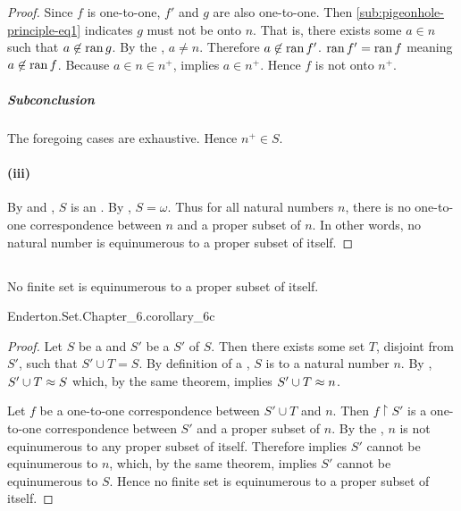 \documentclass{report}
\begin{document}
\begin{proof}
        Since $f$ is one-to-one, $f'$ and $g$ are also one-to-one.
        Then \eqref{sub:pigeonhole-principle-eq1} indicates $g$ must not be onto
          $n$.
        That is, there exists some $a \in n$ such that $a \not\in \mathop{\text{ran}}{g}$.
        By the , $a \neq n$.
        Therefore $a \not\in \mathop{\text{ran}}{f'}$.
        $\mathop{\text{ran}}{f'} = \mathop{\text{ran}}{f}$ meaning $a \not\in \mathop{\text{ran}}{f}$.
        Because $a \in n \in n^+$,  implies $a \in n^+$.
        Hence $f$ is not onto $n^+$.

      \subparagraph{Subconclusion}%

        The foregoing cases are exhaustive.
        Hence $n^+ \in S$.

    \paragraph{(iii)}%

      By  and
        , $S$ is an
        .
      By , $S = \omega$.
      Thus for all natural numbers $n$, there is no one-to-one correspondence
        between $n$ and a proper subset of $n$.
      In other words, no natural number is equinumerous to a proper subset of
        itself.

  \end{proof}

\subsection{}%

  \begin{corollary}[6C]
    No finite set is equinumerous to a proper subset of itself.
  \end{corollary}

    {Enderton.Set.Chapter\_6.corollary\_6c}

  \begin{proof}
    Let $S$ be a  and $S'$ be a
       $S'$ of $S$.
    Then there exists some set $T$, disjoint from $S'$, such that
      $S' \cup T = S$.
    By definition of a , $S$ is
       to a natural number $n$.
    By , $S' \cup T \approx S$ which, by the same
      theorem, implies $S' \cup T \approx n$.

    Let $f$ be a one-to-one correspondence between $S' \cup T$ and $n$.
    Then $f \restriction S'$ is a one-to-one correspondence between $S'$ and a
      proper subset of $n$.
    By the , $n$ is not equinumerous to any
      proper subset of itself.
    Therefore  implies $S'$ cannot be equinumerous to
      $n$, which, by the same theorem, implies $S'$ cannot be equinumerous to
      $S$.
    Hence no finite set is equinumerous to a proper subset of itself.
  \end{proof}
\end{document}
